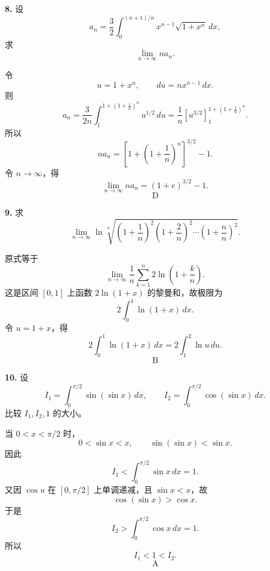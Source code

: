 \begin{problemblock}
\textbf{8.} 设
\[
a_n=\frac32\int_0^{(n+1)/n}x^{n-1}\sqrt{1+x^n}\,dx,
\]
求
\[
\lim_{n\to\infty}na_n.
\]
\end{problemblock}

\begin{solutionblock}
令
\[
u=1+x^n,\qquad du=nx^{n-1}\,dx.
\]
则
\[
a_n=\frac{3}{2n}\int_1^{1+\left(1+\frac1n\right)^n}u^{1/2}\,du
=\frac1n\left[u^{3/2}\right]_1^{1+\left(1+\frac1n\right)^n}.
\]
所以
\[
na_n=\left[1+\left(1+\frac1n\right)^n\right]^{3/2}-1.
\]
令 \(n\to\infty\)，得
\[
\lim_{n\to\infty}na_n=(1+e)^{3/2}-1.
\]
\[
\boxed{\text{D}}
\]
\end{solutionblock}

\begin{problemblock}
\textbf{9.} 求
\[
\lim_{n\to\infty}\ln\sqrt[n]{\left(1+\frac1n\right)^2
\left(1+\frac2n\right)^2\cdots
\left(1+\frac nn\right)^2}.
\]
\end{problemblock}

\begin{solutionblock}
原式等于
\[
\lim_{n\to\infty}\frac1n\sum_{k=1}^n
2\ln\left(1+\frac{k}{n}\right).
\]
这是区间 \([0,1]\) 上函数 \(2\ln(1+x)\) 的黎曼和，故极限为
\[
2\int_0^1\ln(1+x)\,dx.
\]
令 \(u=1+x\)，得
\[
2\int_0^1\ln(1+x)\,dx=2\int_1^2\ln u\,du.
\]
\[
\boxed{\text{B}}
\]
\end{solutionblock}

\begin{problemblock}
\textbf{10.} 设
\[
I_1=\int_0^{\pi/2}\sin(\sin x)\,dx,\qquad
I_2=\int_0^{\pi/2}\cos(\sin x)\,dx.
\]
比较 \(I_1,I_2,1\) 的大小。
\end{problemblock}

\begin{solutionblock}
当 \(0<x<\pi/2\) 时，
\[
0<\sin x<x,\qquad \sin(\sin x)<\sin x.
\]
因此
\[
I_1<\int_0^{\pi/2}\sin x\,dx=1.
\]
又因 \(\cos u\) 在 \([0,\pi/2]\) 上单调递减，且 \(\sin x<x\)，故
\[
\cos(\sin x)>\cos x.
\]
于是
\[
I_2>\int_0^{\pi/2}\cos x\,dx=1.
\]
所以
\[
I_1<1<I_2.
\]
\[
\boxed{\text{A}}
\]
\end{solutionblock}

